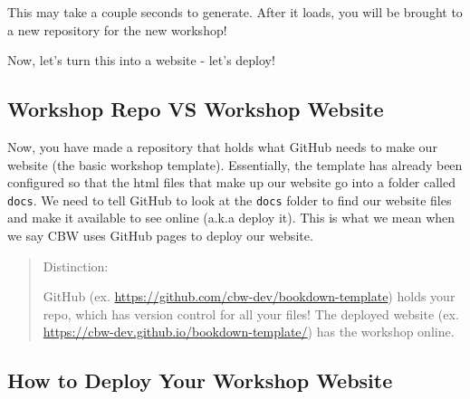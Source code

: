 \documentclass[
]{book}
\theoremstyle{definition}
\theoremstyle{definition}
\theoremstyle{definition}
\theoremstyle{definition}
\theoremstyle{remark}
\begin{document}
\begin{enumerate}
  This may take a couple seconds to generate. After it loads, you will be brought to a new repository for the new workshop!

  Now, let's turn this into a website - let's deploy!
\end{enumerate}

\subsection{Workshop Repo VS Workshop Website}\label{workshop-vs-repo}

Now, you have made a repository that holds what GitHub needs to make our website (the basic workshop template). Essentially, the template has already been configured so that the html files that make up our website go into a folder called \texttt{docs}. We need to tell GitHub to look at the \texttt{docs} folder to find our website files and make it available to see online (a.k.a deploy it). This is what we mean when we say CBW uses GitHub pages to deploy our website.

\begin{quote}
Distinction:

GitHub (ex. \url{https://github.com/cbw-dev/bookdown-template}) holds your repo, which has version control for all your files! The deployed website (ex. \url{https://cbw-dev.github.io/bookdown-template/}) has the workshop online.
\end{quote}

\subsection{How to Deploy Your Workshop Website}\label{deploy-website}
\end{document}
